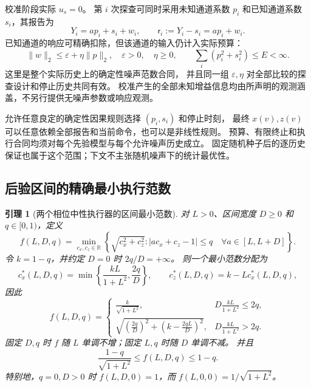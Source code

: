 \documentclass[11pt,a4paper]{article}
\numberwithin{equation}{section}
\newtheorem{lemma}[theorem]{引理}
\theoremstyle{definition}
\begin{document}
校准阶段实际 $u_s=0$。
第 $i$ 次探查可同时采用未知通道系数 $p_i$ 和已知通道系数 $s_i$，其报告为
\begin{equation}
 Y_i=ap_i+s_i+w_i,
 \qquad \mathsf r_i:=Y_i-s_i=ap_i+w_i.
 \label{v44r:eq:calibration-oracle}
\end{equation}
已知通道的响应可精确扣除，但该通道的输入仍计入实际预算：
\begin{equation}
 \|w\|_2\le\varepsilon+\eta\|p\|_2,
 \quad \varepsilon>0,\quad\eta\ge0,
 \qquad
 \sum_i(p_i^2+s_i^2)\le E<\infty.
 \label{v44r:eq:noise-and-total-energy}
\end{equation}
这里是整个实际历史上的确定性噪声范数合同，
并且同一组 $\varepsilon,\eta$ 对全部比较的探查设计和停止历史共同有效。
校准产生的全部未知增益信息均由所声明的观测涵盖，不另行提供无噪声参数或响应观测。

允许任意良定的确定性因果规则选择 $(p_i,s_i)$ 和停止时刻，
最终 $x(v),z(v)$ 可以任意依赖全部报告和当前命令，也可以是非线性规则。
预算、有限终止和执行合同均须对每个先验模型与每个允许噪声历史成立。
固定随机种子后的逐历史保证也属于这个范围；下文不主张随机噪声下的统计最优性。

\subsection{后验区间的精确最小执行范数}

\begin{lemma}[两个相位中性执行器的区间最小范数]
\label{v44r:lem:interval-minimum}
对 $L>0$、区间宽度 $D\ge0$ 和 $q\in[0,1)$，定义
\begin{equation}
 f(L,D,q)=
 \min_{c_x,c_z\in\mathbb R}
 \left\{\sqrt{c_x^2+c_z^2}:
       |ac_x+c_z-1|\le q\quad\forall a\in[L,L+D]\right\}.
 \label{v44r:eq:interval-minimum-definition}
\end{equation}
令 $k=1-q$，并约定 $D=0$ 时 $2q/D=+\infty$。
则一个最小范数分配为
\begin{equation}
 c_x^*(L,D,q)
 =\min\left\{\frac{kL}{1+L^2},\frac{2q}{D}\right\},
 \qquad
 c_z^*(L,D,q)=k-Lc_x^*(L,D,q),
 \label{v44r:eq:interval-minimum-allocation}
\end{equation}
因此
\begin{equation}
 \boxed{
 f(L,D,q)=
 \begin{cases}
 \displaystyle\frac{k}{\sqrt{1+L^2}},
   &\displaystyle D\frac{kL}{1+L^2}\le2q,\\[2mm]
 \displaystyle\sqrt{\left(\frac{2q}{D}\right)^2+
                    \left(k-\frac{2qL}{D}\right)^2},
   &\displaystyle D\frac{kL}{1+L^2}>2q.
 \end{cases}}
 \label{v44r:eq:interval-minimum-closed-form}
\end{equation}
固定 $D,q$ 时 $f$ 随 $L$ 单调不增；固定 $L,q$ 时随 $D$ 单调不减。
并且
\begin{equation}
 \frac{1-q}{\sqrt{1+L^2}}\le f(L,D,q)\le1-q.
 \label{v44r:eq:interval-minimum-bounds}
\end{equation}
特别地，$q=0,D>0$ 时 $f(L,D,0)=1$，而
$f(L,0,0)=1/\sqrt{1+L^2}$。
\end{lemma}
\end{document}
